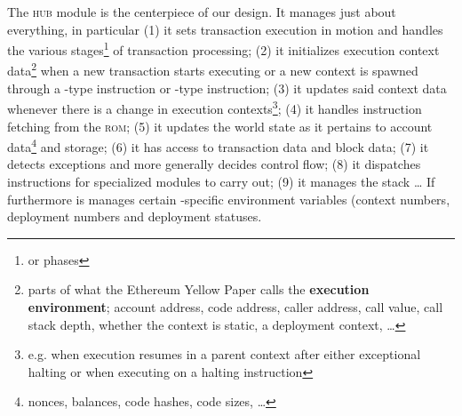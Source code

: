 The \textsc{hub} module is the centerpiece of our \zkEvm{} design.
It manages just about everything, in particular
(1) it sets transaction execution in motion and handles the various stages\footnote{or phases} of transaction processing;
(2) it initializes execution context data\footnote{parts of what the Ethereum Yellow Paper \cite{EYP-London} calls the \textbf{execution environment}; account address, code address, caller address, call value, call stack depth, whether the context is static, a deployment context, \dots{}} when a new transaction starts executing or a new context is spawned through a -type instruction or -type instruction;
(3) it updates said context data whenever there is a change in execution contexts\footnote{e.g. when execution resumes in a parent context after either exceptional halting or when executing on a halting instruction};
(4) it handles instruction fetching from the \textsc{rom};
(5) it updates the world state as it pertains to account data\footnote{nonces, balances, code hashes, code sizes, \dots{}} and storage;
(6) it has access to transaction data and block data;
(7) it detects exceptions and more generally decides control flow;
(8) it dispatches instructions for specialized modules to carry out;
(9) it manages the stack \dots{}
If furthermore is manages certain \zkEvm{}-specific environment variables (context numbers, deployment numbers and deployment statuses.
